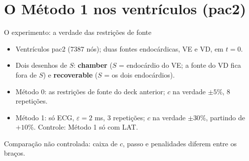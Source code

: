 
\section{O Método 1 nos ventrículos (pac2)}

\begin{frame}{O experimento: a verdade das restrições de fonte}
  \small
  \begin{itemize}\setlength{\itemsep}{0.3em}
    \item Ventrículos pac2 (7387 nós); duas fontes endocárdicas, VE e VD, em $t = 0$.
    \item Dois desenhos de $S$: \textbf{chamber} ($S$ = endocárdio do VE; a fonte do VD fica fora de $S$) e \textbf{recoverable} ($S$ = os dois endocárdios).
    \item Método 0: as restrições de fonte do deck anterior; $c$ na verdade $\pm 5\%$, 8 repetições.
    \item Método 1: só ECG, $\varepsilon = 2$ ms, 3 repetições; $c$ na verdade $\pm 30\%$, partindo de $+10\%$. Controle: Método 1 só com LAT.
  \end{itemize}
  \vfill
  {\scriptsize\color{gray} Comparação não controlada: caixa de $c$, passo e penalidades diferem entre os braços.}
\end{frame}

